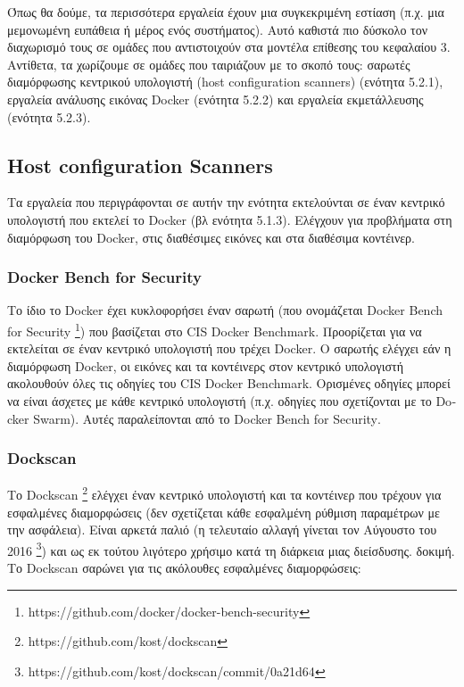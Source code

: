 Όπως θα δούμε, τα περισσότερα εργαλεία έχουν μια συγκεκριμένη εστίαση (π.χ. μια
μεμονωμένη ευπάθεια ή μέρος ενός συστήματος). Αυτό καθιστά πιο δύσκολο τον
διαχωρισμό τους σε ομάδες που αντιστοιχούν στα μοντέλα επίθεσης του κεφαλαίου 3.
Αντίθετα, τα χωρίζουμε σε ομάδες που ταιριάζουν με το σκοπό τους: σαρωτές
διαμόρφωσης κεντρικού υπολογιστή (\textlatin{host configuration scanners})
(ενότητα 5.2.1), εργαλεία ανάλυσης εικόνας \textlatin{Docker} (ενότητα 5.2.2)
και εργαλεία εκμετάλλευσης (ενότητα 5.2.3).

\subsection{\textlatin{Host configuration Scanners}}

Τα εργαλεία που περιγράφονται σε αυτήν την ενότητα εκτελούνται σε έναν κεντρικό
υπολογιστή που εκτελεί το \textlatin{Docker} (βλ ενότητα 5.1.3). Ελέγχουν για
προβλήματα στη διαμόρφωση του \textlatin{Docker}, στις διαθέσιμες εικόνες και
στα διαθέσιμα κοντέινερ.

\subsubsection{\textlatin{Docker Bench for Security}}

Το ίδιο το \textlatin{Docker} έχει κυκλοφορήσει έναν σαρωτή (που ονομάζεται
\textlatin{Docker Bench for Security}
\footnote{\textlatin{https://github.com/docker/docker-bench-security}}) που
βασίζεται στο \textlatin{CIS Docker Benchmark}. Προορίζεται για να εκτελείται σε
έναν κεντρικό υπολογιστή που τρέχει \textlatin{Docker}. Ο σαρωτής ελέγχει εάν η
διαμόρφωση \textlatin{Docker}, οι εικόνες και τα κοντέινερς στον κεντρικό
υπολογιστή ακολουθούν όλες τις οδηγίες του \textlatin{CIS Docker Benchmark}.
Ορισμένες οδηγίες μπορεί να είναι άσχετες με κάθε κεντρικό υπολογιστή (π.χ.
οδηγίες που σχετίζονται με το \textlatin{Docker Swarm}). Αυτές παραλείπονται από
το \textlatin{Docker Bench for Security}.

\subsubsection{\textlatin{Dockscan}}

Το \textlatin{Dockscan} \footnote{\textlatin{https://github.com/kost/dockscan}}
ελέγχει έναν κεντρικό υπολογιστή και τα κοντέινερ που τρέχουν για εσφαλμένες
διαμορφώσεις (δεν σχετίζεται κάθε εσφαλμένη ρύθμιση παραμέτρων με την ασφάλεια).
Είναι αρκετά παλιό (η τελευταίο αλλαγή γίνεται τον Αύγουστο του 2016
\footnote{\textlatin{https://github.com/kost/dockscan/commit/0a21d64}}) και ως
εκ τούτου λιγότερο χρήσιμο κατά τη διάρκεια μιας διείσδυσης. δοκιμή. Το
\textlatin{Dockscan} σαρώνει για τις ακόλουθες εσφαλμένες διαμορφώσεις:

